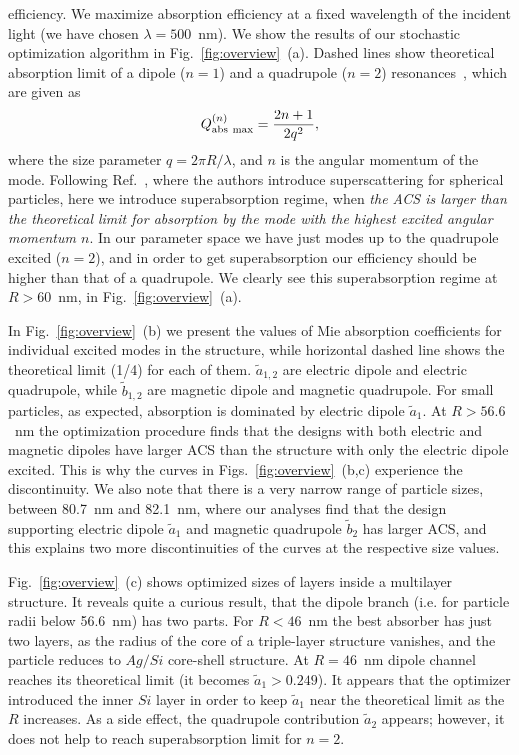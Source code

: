 \documentclass[aps,prl,twocolumn,showpacs,superscriptaddress,groupedaddress]{revtex4-1}
\begin{document}
efficiency. We maximize absorption efficiency at a fixed wavelength of
the incident light (we have chosen $\lambda=500$~nm). We show the
results of our stochastic optimization algorithm in
Fig.~\ref{fig:overview}~(a).  Dashed lines show theoretical absorption
limit of a dipole ($n=1$) and a quadrupole ($n=2$)
resonances~\cite{Tribelsky-2011}, which are given as $$Q^{(n)}_{\rm
  abs\ max}=\frac{2n+1}{2q^2},$$ where the size parameter $q=2\pi
R/\lambda$, and $n$ is the angular momentum of the mode. Following
Ref.~\cite{Fan-2011}, where the authors introduce superscattering for
spherical particles, here we introduce superabsorption regime, when
{\em the ACS is larger than the theoretical limit for absorption by
  the mode with the highest excited angular momentum $n$}. In our
parameter space we have just modes up to the quadrupole excited
($n=2$), and in order to get superabsorption our efficiency should be
higher than that of a quadrupole. We clearly see this superabsorption
regime at $R>60$~nm, in Fig.~\ref{fig:overview}~(a).

In Fig.~\ref{fig:overview}~(b) we present the values of Mie absorption
coefficients for individual excited modes in the structure, while
horizontal dashed line shows the theoretical limit (1/4) for each of
them. $\tilde{a}_{1,2}$ are electric dipole and electric quadrupole,
while $\tilde{b}_{1,2}$ are magnetic dipole and magnetic
quadrupole. For small particles, as expected, absorption is dominated
by electric dipole $\tilde{a}_1$.  At $R > 56.6$~nm the optimization
procedure finds that the designs with both electric and magnetic
dipoles have larger ACS than the structure with only the electric
dipole excited. This is why the curves in
Figs.~\ref{fig:overview}~(b,c) experience the discontinuity. We also
note that there is a very narrow range of particle sizes, between
80.7~nm and 82.1~nm, where our analyses find that the design
supporting electric dipole $\tilde{a}_1$ and magnetic quadrupole
$\tilde{b}_2$ has larger ACS, and this explains two more
discontinuities of the curves at the respective size values.

Fig.~\ref{fig:overview}~(c) shows optimized sizes of layers inside a
multilayer structure. It reveals quite a curious result, that the
dipole branch (i.e. for particle radii below 56.6~nm) has two
parts. For $R<46$~nm the best absorber has just two layers, as the
radius of the core of a triple-layer structure vanishes, and the
particle reduces to $Ag/Si$ core-shell structure.  At $R=46$~nm dipole
channel reaches its theoretical limit (it becomes
$\tilde{a}_1>0.249$).  It appears that the optimizer introduced the
inner $Si$ layer in order to keep $\tilde{a}_1$ near the theoretical
limit as the $R$ increases.  As a side effect, the quadrupole
contribution $\tilde{a}_2$ appears; however, it does not help to reach
superabsorption limit for $n=2$.
\end{document}
